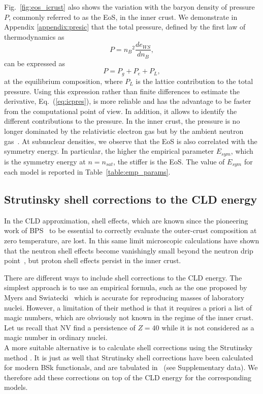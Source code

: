 Fig.~\ref{fig:eos_icrust} also shows the variation with the 
baryon density of pressure $P$, commonly referred to as the EoS, in the inner
crust. We demonstrate in Appendix \ref{appendix:presic} that the total
pressure, defined by the first law of thermodynamics as
%
\begin{equation}
  P = {n_B}^2\frac{de_{WS}}{dn_B},\label{eq:icpres}
\end{equation}
%
can be expressed as
%
\begin{equation}
  P = P_g + P_e + P_L,
\end{equation}
%
at the equilibrium composition,
where $P_L$ is the lattice contribution to the total pressure. Using this
expression rather than finite differences to estimate the derivative,
Eq.~(\ref{eq:icpres}), is more reliable and has the advantage to be faster from the
computational point of view. In addition, it allows to identify the different
contributions to the pressure. In the inner crust, the pressure is no longer 
dominated by the relativistic electron gas but by the ambient neutron 
gas~\cite{Carreau2017}. At subnuclear densities, we observe that the EoS is 
also correlated with the symmetry energy. In particular, the higher the 
empirical parameter $E_{sym}$, which is the symmetry energy at $n=n_{sat}$, the 
stiffer is the EoS. The value of $E_{sym}$ for each model is reported in
Table~\ref{table:emp_params}.

\subsection{Strutinsky shell corrections to the CLD
energy}\label{subsec:strutinsky}

In the CLD approximation, shell effects, which are known since the pioneering 
work of BPS~\cite{BPS} to be essential to correctly evaluate the outer-crust
composition at zero temperature, are lost.
In this same limit microscopic calculations have shown that the neutron 
shell effects become vanishingly small beyond the neutron drip 
point~\cite{Chamel2006,Chamel2007}, but proton shell effects 
persist in the inner crust.

There are different ways to include shell corrections to the CLD energy. The
simplest approach is to use an empirical formula, such as the one proposed
by Myers and Swiatecki~\cite{Myers1966} which is accurate for reproducing
masses of laboratory nuclei. 
However, a limitation of their method 
is that it requires a priori a list of magic numbers, which are obviously not
known in the regime of the inner crust. Let us recall that NV find a
persistence of $Z=40$ while it is not considered as a magic number in ordinary
nuclei.\\
A more suitable alternative is to calculate shell corrections using the
Strutinsky method \cite{Onsi2008}. 
It is just as well that Strutinsky shell corrections have been calculated 
for modern BSk functionals, and are tabulated in~\cite{Pearson2018} (see
Supplementary data). We therefore add these corrections on top of the CLD 
energy for the corresponding models.

